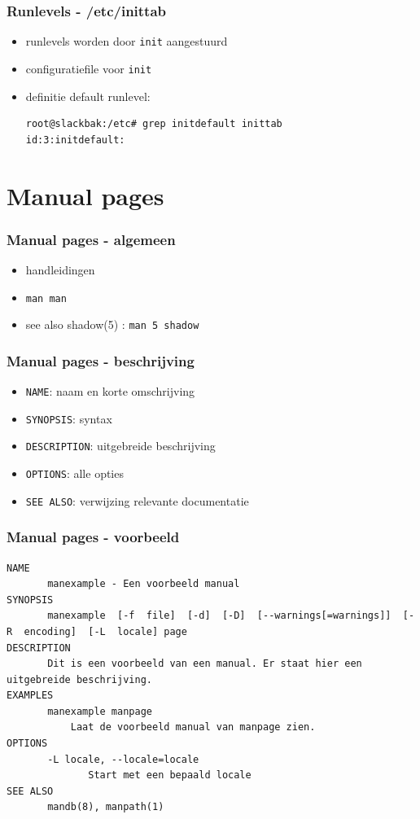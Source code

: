 \documentclass{beamer}
\begin{document}
\begin{frame}[fragile]
  \frametitle{Runlevels - /etc/inittab}
  \begin{itemize}
    \item<1-> runlevels worden door \texttt{init} aangestuurd
    \item<2-> configuratiefile voor \texttt{init}
    \item<3-> definitie default runlevel:
      \begin{lstlisting}
root@slackbak:/etc# grep initdefault inittab
id:3:initdefault:
      \end{lstlisting}
  \end{itemize}
\end{frame}

\section{Manual pages}

\begin{frame}
  \frametitle{Manual pages - algemeen}
  \begin{itemize}
  \item<1-> handleidingen
  \item<2-> \texttt{man man}
  \item<3-> see also shadow(5) : \texttt{man 5 shadow}
  \end{itemize}
\end{frame}

\begin{frame}
  \frametitle{Manual pages - beschrijving}
  \begin{itemize}
  \item<1-> \texttt{NAME}: naam en korte omschrijving
  \item<2-> \texttt{SYNOPSIS}: syntax
  \item<3-> \texttt{DESCRIPTION}: uitgebreide beschrijving
  \item<4-> \texttt{OPTIONS}: alle opties
  \item<5-> \texttt{SEE ALSO}: verwijzing relevante documentatie
  \end{itemize}
\end{frame}

\begin{frame}[fragile]
  \frametitle{Manual pages - voorbeeld}
  \begin{lstlisting}
NAME
       manexample - Een voorbeeld manual
SYNOPSIS
       manexample  [-f  file]  [-d]  [-D]  [--warnings[=warnings]]  [-R  encoding]  [-L  locale] page
DESCRIPTION
       Dit is een voorbeeld van een manual. Er staat hier een uitgebreide beschrijving.
EXAMPLES
       manexample manpage
           Laat de voorbeeld manual van manpage zien.
OPTIONS
       -L locale, --locale=locale
              Start met een bepaald locale
SEE ALSO
       mandb(8), manpath(1)
  \end{lstlisting}
\end{frame}
\end{document}
